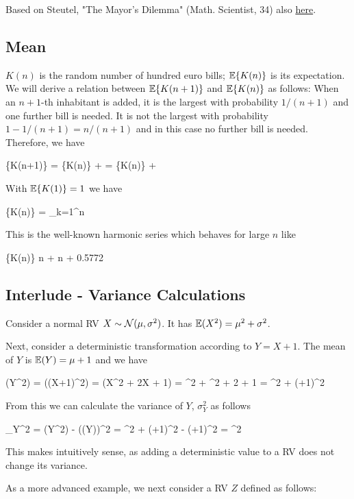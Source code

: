 
Based on Steutel, "The Mayor's Dilemma" (Math. Scientist, 34) also  \href{files/34_2_1.pdf}{here}.

\subsection{Mean}

$K(n)$ is the random number of hundred euro bills; $\mathbb{E}\{K(n)\}$ is its expectation. We will derive a relation between $\mathbb{E}\{K(n+1)\}$ and $\mathbb{E}\{K(n)\}$ as follows: When an $n+1$-th inhabitant is added, it is the largest with probability $1/(n+1)$ and one further bill is needed. It is not the largest with probability $1 - 1/(n+1) = n/(n+1)$ and in this case no further bill is needed. Therefore, we have 

\bee
\mE\{K(n+1)\} = \mE\{K(n)\} + \left[ \mE\{K(n)\}+1 \right] = \mE\{K(n)\} + 
\eee

With $\mathbb{E}\{K(1)\} = 1$ we have

\bee
\mE\{K(n)\} = \sum_{k=1}^n 
\eee

This is the well-known harmonic series which behaves for large $n$ like

\bee
\mE\{K(n)\} \approx \log n + \gamma \approx \log n + 0.5772
\eee



\subsection{Interlude - Variance Calculations}

Consider a normal RV $X \sim \mathcal{N}(\mu, \sigma^2)$. It has $\mathbb{E}(X^2) = \mu^2 + \sigma^2$.

Next, consider a deterministic transformation according to $Y = X+1$. The mean of $Y$ is $\mathbb{E}(Y) = \mu + 1$ and we have

\bee
\mE(Y^2) = \mE((X+1)^2) = \mE(X^2 + 2X + 1) = \mu^2 + \sigma^2 + 2 \mu + 1 = \sigma^2 + (\mu+1)^2
\eee

From this we can calculate the variance of $Y$, $\sigma_Y^2$ as follows

\bee
\sigma_Y^2 = \mE(Y^2) - (\mE(Y))^2 = \sigma^2 + (\mu+1)^2 - (\mu+1)^2 = \sigma^2
\eee

This makes intuitively sense, as adding a deterministic value to a RV does not change its variance.

As a more advanced example, we next consider a RV $Z$ defined as follows:

